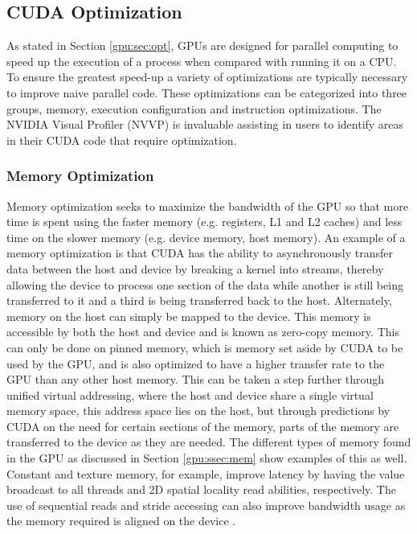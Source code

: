 \subsection{CUDA Optimization}\label{gpu:sec:cop}
As stated in Section \ref{gpu:sec:opt}, GPUs are designed for parallel computing to speed up the execution of a process when compared with running it on a CPU. To ensure the greatest speed-up a variety of optimizations are typically necessary to improve naive parallel code. These optimizations can be categorized into three groups, memory, execution configuration and instruction optimizations. The NVIDIA Visual Profiler (NVVP) is invaluable assisting in users to identify areas in their CUDA code that require optimization.
\subsubsection{Memory Optimization}
Memory optimization seeks to maximize the bandwidth of the GPU so that more time is spent using the faster memory (e.g. registers, L1 and L2 caches) and less time on the slower memory (e.g. device memory, host memory). An example of a memory optimization is that CUDA has the ability to asynchronously transfer data between the host and device by breaking a kernel into streams, thereby allowing the device to process one section of the data while another is still being transferred to it and a third is being transferred back to the host. Alternately, memory on the host can simply be mapped to the device. This memory is accessible by both the host and device and is known as zero-copy memory. This can only be done on pinned memory, which is memory set aside by CUDA to be used by the GPU, and is also optimized to have a higher transfer rate to the GPU than any other host memory. This can be taken a step further through unified virtual addressing, where the host and device share a single virtual memory space, this address space lies on the host, but through predictions by CUDA on the need for certain sections of the memory, parts of the memory are transferred to the device as they are needed. The different types of memory found in the GPU as discussed in Section \ref{gpu:ssec:mem} show examples of this as well. Constant and texture memory, for example, improve latency by having the value broadcast to all threads and 2D spatial locality read abilities, respectively. The use of sequential reads and stride accessing can also improve bandwidth usage as the memory required is aligned on the device \citep{CUDA}.
%
